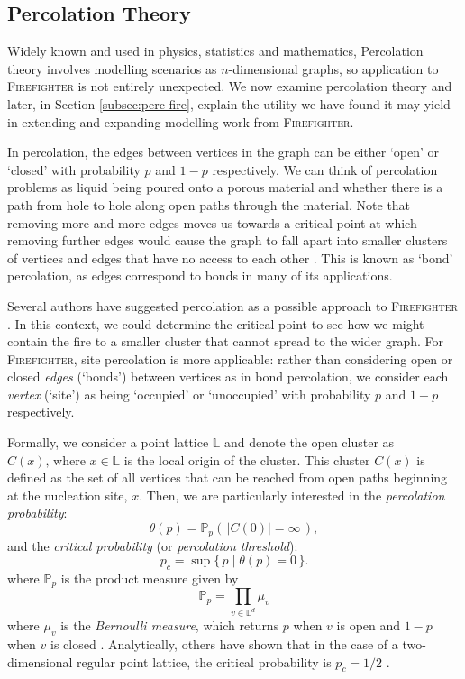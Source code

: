 \documentclass[../report.tex]{subfiles}
\begin{document}

\subsection{Percolation Theory}
\label{sec:perc}

Widely known and used in physics, statistics and mathematics, Percolation theory involves modelling scenarios as $n$-dimensional graphs, so application to {\scshape Firefighter} is not entirely unexpected. We now examine percolation theory and later, in Section \ref{subsec:perc-fire}, explain the utility we have found it may yield in extending and expanding modelling work from {\scshape Firefighter}.

In percolation, the edges between vertices in the graph can be either `open' or `closed' with probability $p$ and $1-p$ respectively. We can think of percolation problems as liquid being poured onto a porous material and whether there is a path from hole to hole along open paths through the material. Note that removing more and more edges moves us towards a critical point at which removing further edges would cause the graph to fall apart into smaller clusters of vertices and edges that have no access to each other \cite{grimmett_1999}. This is known as `bond' percolation, as edges correspond to bonds in many of its applications.

Several authors have suggested percolation as a possible approach to {\scshape Firefighter} \cite{finbow_2009}. In this context, we could determine the critical point to see how we might contain the fire to a smaller cluster that cannot spread to the wider graph. For {\scshape Firefighter}, site percolation is more applicable: rather than considering open or closed \emph{edges} (`bonds') between vertices as in bond percolation, we consider each \emph{vertex} (`site') as being `occupied' or `unoccupied' with probability $p$ and $1-p$ respectively.

Formally, we consider a point lattice $\mathbb{L}$ and denote the open cluster as $C(x)\text{,~where~}x\in\mathbb{L}$ is the local origin of the cluster. This cluster $C(x)$ is defined as the set of all vertices that can be reached from open paths beginning at the nucleation site, $x$. Then, we are particularly interested in the \emph{percolation probability}:
$$
\theta(p) = \mathbb{P}_p(\,|C(0)|=\infty\,),
$$
and the \emph{critical probability} (or \emph{percolation threshold}):
$$
p_c = \sup\{\,p \mid \theta(p)=0\,\}.
$$
where $\mathbb{P}_p$ is the product measure given by
$$
\displaystyle \mathbb{P}_p=\prod_{v\in\mathbb{L}^d}\mu_v
$$
where $\mu_v$ is the \emph{Bernoulli measure}, which returns $p$ when $v$ is open and $1-p$ when $v$ is closed \cite[p. 28]{klenke_2014}. Analytically, others have shown that in the case of a two-dimensional regular point lattice, the critical probability is $p_c=1/2$ \cite{kersten_1980}.
\end{document}
